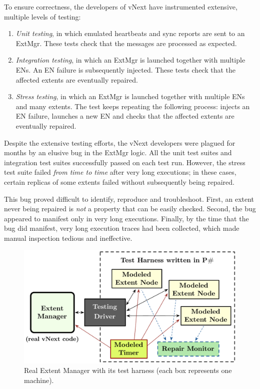 To ensure correctness, the developers of vNext have instrumented extensive, multiple levels of testing:
\begin{enumerate}
\item \emph{Unit testing}, in which emulated heartbeats and sync reports are sent to an ExtMgr. These tests check that the messages are processed as expected.

\item \emph{Integration testing}, in which an ExtMgr is launched together with multiple ENs. An EN failure is subsequently injected. These tests check that the affected extents are eventually repaired.

\item \emph{Stress testing}, in which an ExtMgr is launched together with multiple ENs and many extents. The test keeps repeating the following process: injects an EN failure, launches a new EN and checks that the affected extents are eventually repaired.
\end{enumerate}

\noindent
Despite the extensive testing efforts, the vNext developers were plagued for months by an elusive bug in the ExtMgr logic. All the unit test suites and integration test suites successfully passed on each test run. However, the stress test suite failed \emph{from time to time} after very long executions; in these cases, certain replicas of some extents failed without subsequently being repaired.

This bug proved difficult to identify, reproduce and troubleshoot. First, an extent never being repaired is \emph{not} a property that can be easily checked. Second, the bug appeared to manifest only in very long executions. Finally, by the time that the bug did manifest, very long execution traces had been collected, which made manual inspection tedious and ineffective.

\begin{figure}[t]
\centering
\includegraphics[width=\linewidth]{img/modeled_vnext}
\vspace{-6mm}
\caption{Real Extent Manager with its \psharp test harness (each box represents one \psharp machine).}
\label{fig:azurestoremodel}
\vspace{-2mm}
\end{figure}

